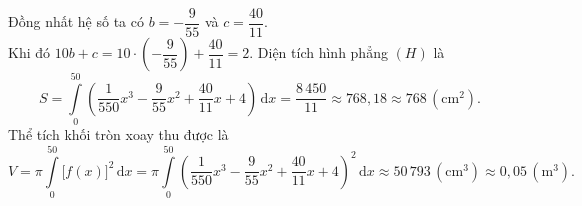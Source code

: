 \begin{ex}
{\begin{itemchoice}
			Đồng nhất hệ số ta có $b = -\dfrac{9}{55}$ và $c = \dfrac{40}{11}$.\\
			Khi đó $10b+c = 10 \cdot \left(-\dfrac{9}{55}\right) + \dfrac{40}{11} = 2$.
			\itemch Diện tích hình phẳng $(H)$ là
			\[S = \displaystyle\int\limits_{0}^{50} \left( \dfrac{1}{550}x^3 - \dfrac{9}{55}x^2 + \dfrac{40}{11}x + 4 \right) \mathrm{\,d}x = \dfrac{8\,450}{11} \approx 768{,}18 \approx 768 \,(\text{cm}^2).\]
			\itemch Thể tích khối tròn xoay thu được là
			\[V = \pi \displaystyle\int\limits_{0}^{50} \big[f(x)\big]^2 \mathrm{\,d}x=\pi \displaystyle\int\limits_{0}^{50} \left(\dfrac{1}{550}x^3 - \dfrac{9}{55}x^2 + \dfrac{40}{11}x + 4\right)^2 \mathrm{\,d}x\approx 50\,793 \,(\text{cm}^3) \approx 0{,}05 \,(\text{m}^3).\]
		\end{itemchoice}
	}
\end{ex}

